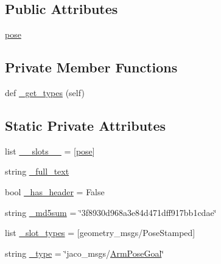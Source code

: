 \subsection*{Public Attributes}
\begin{DoxyCompactItemize}
\item 
\hyperlink{classjaco__msgs_1_1msg_1_1__ArmPoseGoal_1_1ArmPoseGoal_ad25889b3ba293b0eba280014befdc9a6}{pose}
\end{DoxyCompactItemize}
\subsection*{Private Member Functions}
\begin{DoxyCompactItemize}
\item 
def \hyperlink{classjaco__msgs_1_1msg_1_1__ArmPoseGoal_1_1ArmPoseGoal_a87ecae2106d56ba4929db99cd36caa37}{\+\_\+get\+\_\+types} (self)
\end{DoxyCompactItemize}
\subsection*{Static Private Attributes}
\begin{DoxyCompactItemize}
\item 
list \hyperlink{classjaco__msgs_1_1msg_1_1__ArmPoseGoal_1_1ArmPoseGoal_aee5f7c2a2640c5b8adfc30644e8b9d46}{\+\_\+\+\_\+slots\+\_\+\+\_\+} = \mbox{[}\textquotesingle{}\hyperlink{classjaco__msgs_1_1msg_1_1__ArmPoseGoal_1_1ArmPoseGoal_ad25889b3ba293b0eba280014befdc9a6}{pose}\textquotesingle{}\mbox{]}
\item 
string \hyperlink{classjaco__msgs_1_1msg_1_1__ArmPoseGoal_1_1ArmPoseGoal_a20af26832f8cc4cfff472cb03d9b2210}{\+\_\+full\+\_\+text}
\item 
bool \hyperlink{classjaco__msgs_1_1msg_1_1__ArmPoseGoal_1_1ArmPoseGoal_ad017c1973333bd4cf797ad273e20c065}{\+\_\+has\+\_\+header} = False
\item 
string \hyperlink{classjaco__msgs_1_1msg_1_1__ArmPoseGoal_1_1ArmPoseGoal_affaeac664a6f0db67baa332a57ef41fb}{\+\_\+md5sum} = \char`\"{}3f8930d968a3e84d471dff917bb1cdae\char`\"{}
\item 
list \hyperlink{classjaco__msgs_1_1msg_1_1__ArmPoseGoal_1_1ArmPoseGoal_ae5ef79807eb2ba6fe225b7791d2a8490}{\+\_\+slot\+\_\+types} = \mbox{[}\textquotesingle{}geometry\+\_\+msgs/Pose\+Stamped\textquotesingle{}\mbox{]}
\item 
string \hyperlink{classjaco__msgs_1_1msg_1_1__ArmPoseGoal_1_1ArmPoseGoal_afbfdf7684d752624b8cd188832371e03}{\+\_\+type} = \char`\"{}jaco\+\_\+msgs/\hyperlink{classjaco__msgs_1_1msg_1_1__ArmPoseGoal_1_1ArmPoseGoal}{Arm\+Pose\+Goal}\char`\"{}
\end{DoxyCompactItemize}


